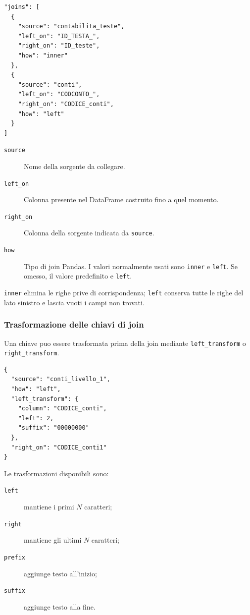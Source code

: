 \begin{lstlisting}
"joins": [
  {
    "source": "contabilita_teste",
    "left_on": "ID_TESTA_",
    "right_on": "ID_teste",
    "how": "inner"
  },
  {
    "source": "conti",
    "left_on": "CODCONTO_",
    "right_on": "CODICE_conti",
    "how": "left"
  }
]
\end{lstlisting}

\begin{description}
  \item[\texttt{source}]
  Nome della sorgente da collegare.

  \item[\texttt{left\_on}]
  Colonna presente nel DataFrame costruito fino a quel momento.

  \item[\texttt{right\_on}]
  Colonna della sorgente indicata da \texttt{source}.

  \item[\texttt{how}]
  Tipo di join Pandas. I valori normalmente usati sono \texttt{inner} e
  \texttt{left}. Se omesso, il valore predefinito e \texttt{left}.
\end{description}

\texttt{inner} elimina le righe prive di corrispondenza; \texttt{left}
conserva tutte le righe del lato sinistro e lascia vuoti i campi non trovati.

\subsubsection{Trasformazione delle chiavi di join}

Una chiave puo essere trasformata prima della join mediante
\texttt{left\_transform} o \texttt{right\_transform}.

\begin{lstlisting}
{
  "source": "conti_livello_1",
  "how": "left",
  "left_transform": {
    "column": "CODICE_conti",
    "left": 2,
    "suffix": "00000000"
  },
  "right_on": "CODICE_conti1"
}
\end{lstlisting}

Le trasformazioni disponibili sono:

\begin{description}
  \item[\texttt{left}] mantiene i primi $N$ caratteri;
  \item[\texttt{right}] mantiene gli ultimi $N$ caratteri;
  \item[\texttt{prefix}] aggiunge testo all'inizio;
  \item[\texttt{suffix}] aggiunge testo alla fine.
\end{description}

